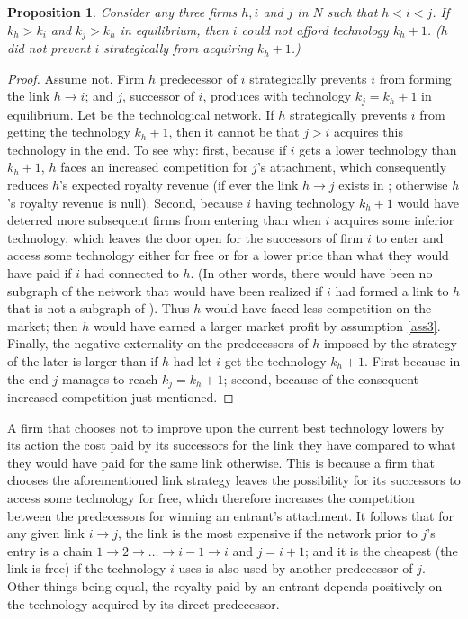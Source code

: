 \documentclass{article}
\newtheorem{proposition}{Proposition}
\begin{document}
\begin{proposition}
Consider any three firms $h,i$ and $j$ in $N$ such that $h<i<j$. If $k_h>k_i$ and $k_j>k_h$ in equilibrium, then $i$ could not afford technology $k_h+1$. ($h$ did not prevent $i$ strategically from acquiring $k_h+1$.)
\end{proposition}
\begin{proof}
Assume not. Firm $h$ predecessor of $i$ strategically prevents $i$ from forming the link $h\rightarrow i$; and $j$, successor of $i$, produces with technology $k_j=k_h+1$ in equilibrium. Let  be the technological network. If $h$ strategically prevents $i$ from getting the technology $k_h+1$, then it cannot be that $j>i$ acquires this technology in the end. To see why: first, because if $i$ gets a lower technology than $k_h+1$, $h$ faces an increased competition for $j$'s attachment, which consequently reduces $h$'s expected royalty revenue (if ever the link $h\rightarrow j$ exists in ; otherwise $h$'s royalty revenue is null). Second, because $i$ having technology $k_h+1$ would have deterred more subsequent firms from entering than when $i$ acquires some inferior technology, which leaves the door open for the successors of firm $i$ to enter and access some technology either for free or for a lower price than what they would have paid if $i$ had connected to $h$. (In other words, there would have been no subgraph of the network that would have been realized if $i$ had formed a link to $h$ that is not a subgraph of ). Thus $h$ would have faced less competition on the market; then $h$ would have earned a larger market profit by assumption \ref{ass3}. Finally, the negative externality on the predecessors of $h$ imposed by the strategy of the later is larger than if $h$ had let $i$ get the technology $k_h+1$. First because in the end $j$ manages to reach $k_j=k_h+1$; second, because of the consequent increased competition just mentioned.   
\end{proof}

A firm that chooses not to improve upon the current best technology lowers by its action the cost paid by its successors for the link they have compared to what they would have paid for the same link otherwise. This is because a firm that chooses the aforementioned link strategy leaves the possibility for its successors to access some technology for free, which therefore increases the competition between the predecessors for winning an entrant's attachment. It follows that for any given link $i\rightarrow j$, the link is the most expensive if the network prior to $j$'s entry is a chain $1\rightarrow 2\rightarrow \ldots \rightarrow i-1\rightarrow i$ and $j=i+1$; and it is the cheapest (the link is free) if the technology $i$ uses is also used by another predecessor of $j$. Other things being equal, the royalty paid by an entrant depends positively on the technology acquired by its direct predecessor. \\
\indent 


%

\end{document}
